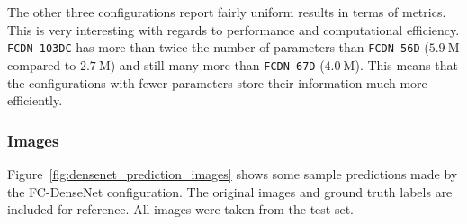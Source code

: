 The other three configurations report fairly uniform results in terms of metrics. This is very interesting with regards to performance and computational efficiency. \texttt{FCDN-103DC} has more than twice the number of parameters than \texttt{FCDN-56D} ($5.9~\text{M}$ compared to $2.7~\text{M}$) and still many more than \texttt{FCDN-67D} ($4.0~\text{M}$). This means that the configurations with fewer parameters store their information much more efficiently.

\subsubsection{Images}
Figure~\ref{fig:densenet_prediction_images} shows some sample predictions made by the FC-DenseNet configuration. The original images and ground truth labels are included for reference. All images were taken from the test set.

